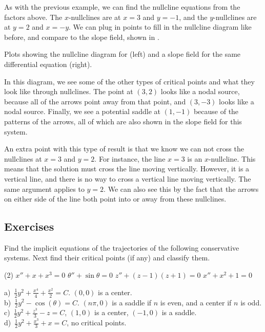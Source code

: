 \begin{exampleSol}
As with the previous example, we can find the nullcline equations from the factors above. The $x$-nullclines are at $x=3$ and $y=-1$, and the $y$-nullclines are at $y=2$ and $x=-y$. We can plug in points to fill in the nullcline diagram like before, and compare to the slope field, shown in . 

\begin{myfig}
\capstart
{}
\caption{Plots showing the nullcline diagram for  (left) and a slope field for the same differential equation (right). \label{fig:NCPlot2}}
\end{myfig}

In this diagram, we see some of the other types of critical points and what they look like through nullclines. The point at $(3,2)$ looks like a nodal source, because all of the arrows point away from that point, and $(3,-3)$ looks like a nodal source. Finally, we see a potential saddle at $(1,-1)$ because of the patterns of the arrows, all of which are also shown in the slope field for this system.

An extra point with this type of result is that we know we can not cross the nullclines at $x=3$ and $y=2$. For instance, the line $x=3$ is an $x$-nullcline. This means that the solution must cross the line moving vertically. However, it is a vertical line, and there is no way to cross a vertical line moving vertically. The same argument applies to $y=2$. We can also see this by the fact that the arrows on either side of the line both point into or away from these nullclines.
\end{exampleSol}


\subsection{Exercises}


\begin{exercise}
\pagebreak[2]
Find the implicit equations of the trajectories of the following
conservative systems.  Next find their critical points (if any) and classify them.
\begin{tasks}(2)
\task $x''+ x+x^3 = 0$
\task $\theta''+\sin \theta = 0$
\task $z''+ (z-1)(z+1) = 0$
\task $x''+ x^2+1 = 0$
\end{tasks}
\end{exercise}
\comboSol{%
}
{%
a)~$\frac{1}{2}y^2 + \frac{x^4}{4} + \frac{x^2}{2} = C$. $(0,0)$ is a center. \\
b)~$\frac{1}{2}y^2 - \cos(\theta) = C$. $(n\pi, 0)$ is a saddle if $n$ is even, and a center if $n$ is odd. \\
c)~$\frac{1}{2}y^2 + \frac{z^3}{3} - z = C$, $(1,0)$ is a center, $(-1, 0)$ is a saddle. \\
d)~$\frac{1}{2}y^2 + \frac{x^3}{3} + x = C$, no critical points.
}

